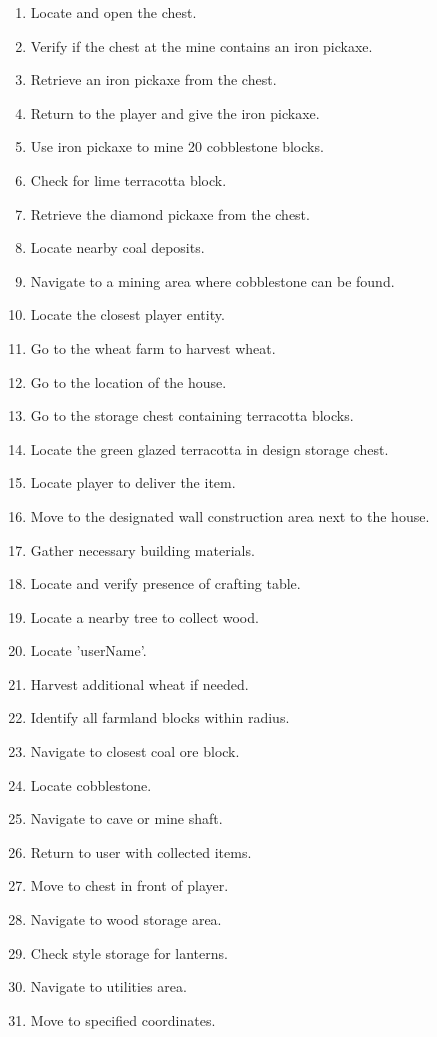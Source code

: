 \begin{small}
\begin{enumerate}
  \item Locate and open the chest.
  \item Verify if the chest at the mine contains an iron pickaxe.
  \item Retrieve an iron pickaxe from the chest.
  \item Return to the player and give the iron pickaxe.
  \item Use iron pickaxe to mine 20 cobblestone blocks.
  \item Check for lime terracotta block.
  \item Retrieve the diamond pickaxe from the chest.
  \item Locate nearby coal deposits.
  \item Navigate to a mining area where cobblestone can be found.
  \item Locate the closest player entity.
  \item Go to the wheat farm to harvest wheat.
  \item Go to the location of the house.
  \item Go to the storage chest containing terracotta blocks.
  \item Locate the green glazed terracotta in design storage chest.
  \item Locate player to deliver the item.
  \item Move to the designated wall construction area next to the house.
  \item Gather necessary building materials.
  \item Locate and verify presence of crafting table.
  \item Locate a nearby tree to collect wood.
  \item Locate 'userName'.
  \item Harvest additional wheat if needed.
  \item Identify all farmland blocks within radius.
  \item Navigate to closest coal ore block.
  \item Locate cobblestone.
  \item Navigate to cave or mine shaft.
  \item Return to user with collected items.
  \item Move to chest in front of player.
  \item Navigate to wood storage area.
  \item Check style storage for lanterns.
  \item Navigate to utilities area.
  \item Move to specified coordinates.
\end{enumerate}
\end{small}

